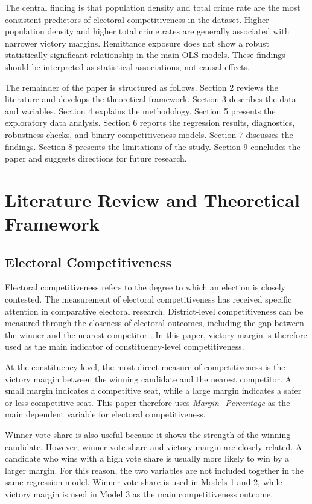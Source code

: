 \documentclass[12pt,a4paper]{article}
\begin{document}
The central finding is that population density and total crime rate are the most consistent predictors of electoral competitiveness in the dataset. Higher population density and higher total crime rates are generally associated with narrower victory margins. Remittance exposure does not show a robust statistically significant relationship in the main OLS models. These findings should be interpreted as statistical associations, not causal effects.

The remainder of the paper is structured as follows. Section 2 reviews the literature and develops the theoretical framework. Section 3 describes the data and variables. Section 4 explains the methodology. Section 5 presents the exploratory data analysis. Section 6 reports the regression results, diagnostics, robustness checks, and binary competitiveness models. Section 7 discusses the findings. Section 8 presents the limitations of the study. Section 9 concludes the paper and suggests directions for future research.

\section{Literature Review and Theoretical Framework}

\subsection{Electoral Competitiveness}

Electoral competitiveness refers to the degree to which an election is closely contested. The measurement of electoral competitiveness has received specific attention in comparative electoral research. District-level competitiveness can be measured through the closeness of electoral outcomes, including the gap between the winner and the nearest competitor \citep{blais2009,cox2020}. In this paper, victory margin is therefore used as the main indicator of constituency-level competitiveness. 

At the constituency level, the most direct measure of competitiveness is the victory margin between the winning candidate and the nearest competitor. A small margin indicates a competitive seat, while a large margin indicates a safer or less competitive seat. This paper therefore uses \textit{Margin\_Percentage} as the main dependent variable for electoral competitiveness.

Winner vote share is also useful because it shows the strength of the winning candidate. However, winner vote share and victory margin are closely related. A candidate who wins with a high vote share is usually more likely to win by a larger margin. For this reason, the two variables are not included together in the same regression model. Winner vote share is used in Models 1 and 2, while victory margin is used in Model 3 as the main competitiveness outcome.
\end{document}
